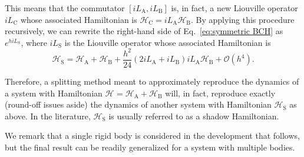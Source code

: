 \documentclass[
	aip,
	jcp,
	reprint,
]{revtex4-1}
\newcommand{\Ham}[1]{{\mathcal H}_\text{#1}}           %
\newcommand{\Liu}[1]{i\!L_\text{#1}}                   %
\newcommand{\timestep}{h}
\begin{document}
This means that the commutator $[\Liu A,\Liu B]$ is, in fact, a new Liouville operator $\Liu C$ whose associated Hamiltonian is $\Ham C = {\Liu A}{\Ham B}$.
By applying this procedure recursively, we can rewrite the right-hand side of Eq.~\eqref{eq:symmetric BCH} as $e^{\timestep \Liu S}$, where $\Liu S$ is the Liouville operator whose associated Hamiltonian is
\begin{equation*}
\label{eq:general shadow hamiltonian}
\Ham{S} = \Ham A + \Ham B + \frac{\timestep^2}{24} (2 \Liu A + \Liu B){\Liu A}{\Ham B} + \mathcal{O}(\timestep^4).
\end{equation*}

Therefore, a splitting method meant to approximately reproduce the dynamics of a system with Hamiltonian $\Ham{} = \Ham A + \Ham B$ will, in fact, reproduce exactly (round-off issues aside) the dynamics of another system with Hamiltonian $\Ham{S}$ as above.
In the literature, $\Ham{S}$ is usually referred to as a shadow Hamiltonian.

We remark that a single rigid body is considered in the development that follows, but the final result can be readily generalized for a system with multiple bodies.
\end{document}
